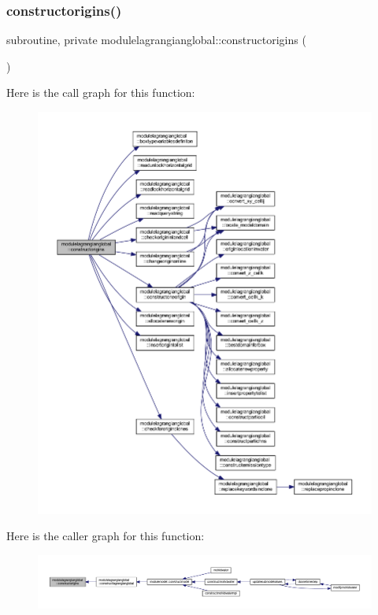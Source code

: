 \subsubsection{\texorpdfstring{constructorigins()}{constructorigins()}}
{\footnotesize\ttfamily subroutine, private modulelagrangianglobal\+::constructorigins (\begin{DoxyParamCaption}{ }\end{DoxyParamCaption})\hspace{0.3cm}{\ttfamily [private]}}

Here is the call graph for this function\+:\nopagebreak
\begin{figure}[H]
\begin{center}
\leavevmode
\includegraphics[width=350pt]{namespacemodulelagrangianglobal_a18659553d3e4f0917dd7bc0bcdb6d109_cgraph}
\end{center}
\end{figure}
Here is the caller graph for this function\+:\nopagebreak
\begin{figure}[H]
\begin{center}
\leavevmode
\includegraphics[width=350pt]{namespacemodulelagrangianglobal_a18659553d3e4f0917dd7bc0bcdb6d109_icgraph}
\end{center}
\end{figure}
\mbox{\label{namespacemodulelagrangianglobal_a083836de958c69614f913a7f1b0bee9e}} 
